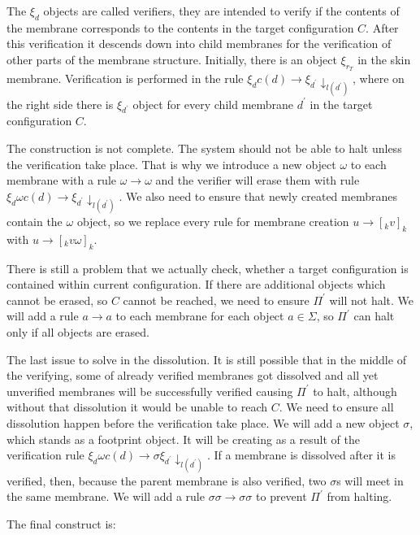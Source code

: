 \documentclass[llncs,submission,copyright,creativecommons]{../lib/lncs/llncs}
\begin{document}
The $\xi_d$ objects are called verifiers, they are intended to verify if the contents of the membrane corresponds to the contents in the target configuration $C$. After this verification it descends down into child membranes for the verification of other parts of the membrane structure.
Initially, there is an object $\xi_{r_T}$ in the skin membrane. Verification is performed in the rule $\xi_d c(d)\rightarrow\xi_{d^\prime}\downarrow_{l(d^\prime)}$, where on the right side there is $\xi_{d^\prime}$ object for every child membrane $d^\prime$ in the target configuration $C$.

The construction is not complete. The system should not be able to halt unless the verification take place. That is why we introduce a new object $\omega$ to each membrane with a rule $\omega\rightarrow\omega$ and the verifier will erase them with rule $\xi_d\omega c(d)\rightarrow\xi_{d^\prime}\downarrow_{l(d^\prime)}$. We also need to ensure that newly created membranes contain the $\omega$ object, so we replace every rule for membrane creation $u\rightarrow [_k v]_k$ with $u\rightarrow [_k v\omega]_k$.

There is still a problem that we actually check, whether a target configuration is contained within current configuration. If there are additional objects which cannot be erased, so $C$ cannot be reached, we need to ensure $\Pi^\prime$ will not halt. We will add a rule $a\rightarrow a$ to each membrane for each object $a\in\Sigma$, so $\Pi^\prime$ can halt only if all objects are erased.

The last issue to solve in the dissolution. It is still possible that in the middle of the verifying, some of already verified membranes got dissolved and all yet unverified membranes will be successfully verified causing $\Pi^\prime$ to halt, although without that dissolution it would be unable to reach $C$. We need to ensure all dissolution happen before the verification take place.
We will add a new object $\sigma$, which stands as a footprint object. It will be creating as a result of the verification rule $\xi_d\omega c(d)\rightarrow\sigma\xi_{d^\prime}\downarrow_{l(d^\prime)}$. If a membrane is dissolved after it is verified, then, because the parent membrane is also verified, two $\sigma$s will meet in the same membrane. We will add a rule $\sigma\sigma\rightarrow\sigma\sigma$ to prevent $\Pi^\prime$ from halting.

The final construct is:
\end{document}
